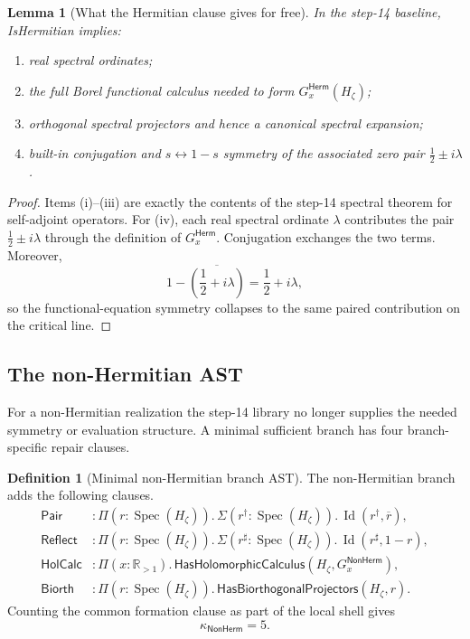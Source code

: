\documentclass[11pt,a4paper]{article}
\theoremstyle{plain}
\newtheorem{lemma}[theorem]{Lemma}
\theoremstyle{definition}
\newtheorem{definition}[theorem]{Definition}
\theoremstyle{remark}
\newcommand{\R}{\mathbb{R}}
\newcommand{\Spec}{\operatorname{Spec}}
\newcommand{\Id}{\operatorname{Id}}
\newcommand{\effort}{\kappa}
\newcommand{\pair}{\ensuremath{\mathsf{Pair}}}
\newcommand{\reflect}{\ensuremath{\mathsf{Reflect}}}
\newcommand{\holcalc}{\ensuremath{\mathsf{HolCalc}}}
\newcommand{\biorth}{\ensuremath{\mathsf{Biorth}}}
\newcommand{\herm}{\ensuremath{\mathsf{Herm}}}
\newcommand{\nonherm}{\ensuremath{\mathsf{NonHerm}}}
\begin{document}
\begin{lemma}[What the Hermitian clause gives for free]
\label{lem:hermfree}
In the step-14 baseline, \textsf{IsHermitian} implies:
\begin{enumerate}[label=(\roman*),leftmargin=2em]
  \item real spectral ordinates;
  \item the full Borel functional calculus needed to form $G_x^{\herm}(H_\zeta)$;
  \item orthogonal spectral projectors and hence a canonical spectral expansion;
  \item built-in conjugation and $s\leftrightarrow 1-s$ symmetry of the associated zero pair $\frac12\pm i\lambda$.
\end{enumerate}
\end{lemma}

\begin{proof}
Items (i)--(iii) are exactly the contents of the step-14 spectral theorem for self-adjoint operators. For (iv), each real spectral ordinate $\lambda$ contributes the pair $\frac12\pm i\lambda$ through the definition of $G_x^{\herm}$. Conjugation exchanges the two terms. Moreover,
\[
1-\overline{\left(\frac12+i\lambda\right)}=\frac12+i\lambda,
\]
so the functional-equation symmetry collapses to the same paired contribution on the critical line.
\end{proof}

\subsection{The non-Hermitian AST}

For a non-Hermitian realization the step-14 library no longer supplies the needed symmetry or evaluation structure. A minimal sufficient branch has four branch-specific repair clauses.

\begin{definition}[Minimal non-Hermitian branch AST]
\label{def:nonherm-ast}
The non-Hermitian branch adds the following clauses.
\begin{align*}
\pair &: \Pi(r:\Spec(H_\zeta)).\, \Sigma(r^{\dagger}:\Spec(H_\zeta)).\, \Id(r^{\dagger},\overline r),\\
\reflect &: \Pi(r:\Spec(H_\zeta)).\, \Sigma(r^{\sharp}:\Spec(H_\zeta)).\, \Id(r^{\sharp},1-r),\\
\holcalc &: \Pi(x:\R_{>1}).\, \mathsf{HasHolomorphicCalculus}(H_\zeta,G_x^{\nonherm}),\\
\biorth &: \Pi(r:\Spec(H_\zeta)).\, \mathsf{HasBiorthogonalProjectors}(H_\zeta,r).
\end{align*}
Counting the common formation clause as part of the local shell gives
\[
\effort_{\nonherm}=5.
\]
\end{definition}
\end{document}

